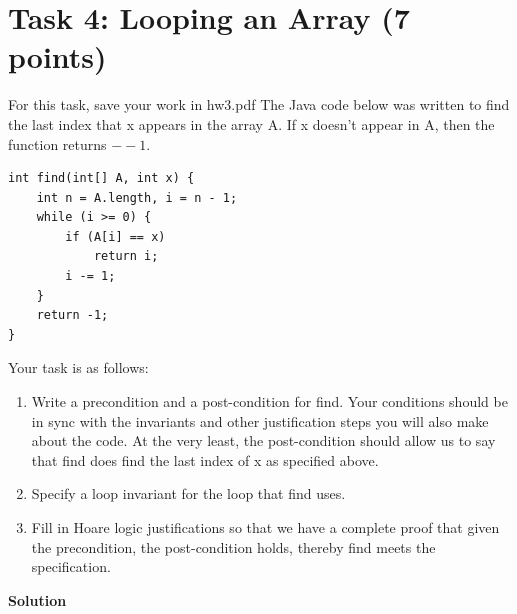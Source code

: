 \documentclass{article}
\newcommand{\solution}{\textbf{\large Solution}}
\theoremstyle{remark}
\begin{document}
\section*{Task 4: Looping an Array (7 points)}

For this task, save your work in hw3.pdf
The Java code below was written to find the last index that x appears in the array A. If x doesn’t appear in A, then the function returns $−-1$.

\begin{verbatim}
int find(int[] A, int x) {
    int n = A.length, i = n - 1;
    while (i >= 0) {
        if (A[i] == x)
            return i;
        i -= 1;
    }
    return -1;
}
\end{verbatim}
Your task is as follows:
\begin{enumerate}
    \item Write a precondition and a post-condition for find. Your conditions should be in sync with the
invariants and other justification steps you will also make about the code. At the very least, the
post-condition should allow us to say that find does find the last index of x as specified above.
    \item Specify a loop invariant for the loop that find uses.
    \item Fill in Hoare logic justifications so that we have a complete proof that given the precondition, the
post-condition holds, thereby find meets the specification.
\end{enumerate}

\medskip
\solution
\end{document}
